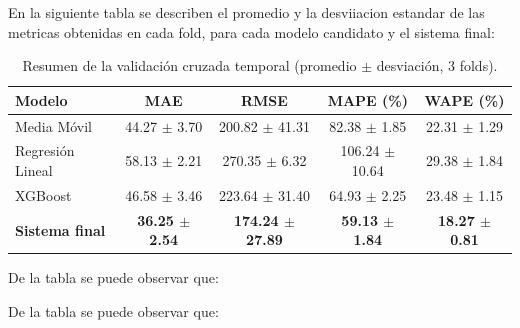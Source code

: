 En la siguiente tabla se describen el promedio y la desviiacion estandar de las metricas obtenidas en cada fold, para cada modelo candidato y el sistema final:


\begin{table}[H]
    \centering
    \caption{Resumen de la validación cruzada temporal (promedio $\pm$ desviación, 3 folds).}
    \label{tab:resumen_cv}
    \begin{tabularx}{\textwidth}{Xcccc}
        \toprule
        \textbf{Modelo} & \textbf{MAE} & \textbf{RMSE} & \textbf{MAPE (\%)} & \textbf{WAPE (\%)} \\
        \midrule
        Media Móvil        & 44.27 $\pm$ 3.70  & 200.82 $\pm$ 41.31 & 82.38 $\pm$ 1.85  & 22.31 $\pm$ 1.29 \\
        Regresión Lineal   & 58.13 $\pm$ 2.21  & 270.35 $\pm$ 6.32  & 106.24 $\pm$ 10.64 & 29.38 $\pm$ 1.84 \\
        XGBoost            & 46.58 $\pm$ 3.46  & 223.64 $\pm$ 31.40 & 64.93 $\pm$ 2.25  & 23.48 $\pm$ 1.15 \\
        \textbf{Sistema final} & \textbf{36.25 $\pm$ 2.54} & \textbf{174.24 $\pm$ 27.89} & \textbf{59.13 $\pm$ 1.84} & \textbf{18.27 $\pm$ 0.81} \\
        \bottomrule
    \end{tabularx}
\end{table}

De la tabla se puede observar que:

De la tabla se puede observar que:

